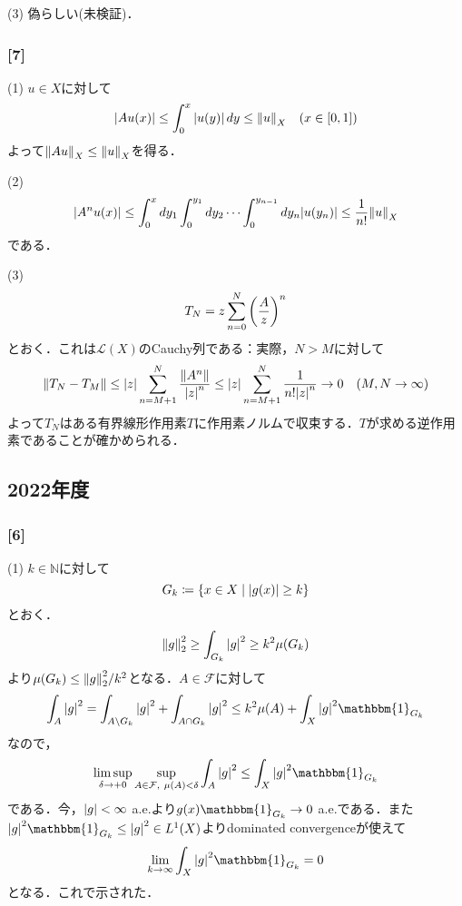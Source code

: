 \documentclass[a4j]{ltjsarticle}
\newcommand{\Nset}{\mathbb{N}}
\newcommand{\1}{\mathbbm{1}}
\numberwithin{equation}{section}
\theoremstyle{definition}
\begin{document}
(3) 偽らしい(未検証)．

\subsubsection*{[7]}
(1) $u\in X$に対して
\begin{equation}
    |Au(x)|\leq \int_{0}^{x}\abs{u(y)}\,dy\leq \norm{u}_{X}\quad (x\in [0,1])
\end{equation}
よって$\norm{Au}_{X}\leq \norm{u}_{X}$を得る．

(2) 
\begin{equation}
    \abs{A^nu(x)}\leq \int_{0}^{x}dy_1\int_{0}^{y_1}dy_2\cdots\int_{0}^{y_{n-1}}dy_{n}\abs{u(y_{n})}\leq \frac{1}{n!}\norm{u}_{X}
\end{equation}
である．

(3) 
\begin{equation}
    T_N=z\sum_{n=0}^N\qty(\frac{A}{z})^n 
\end{equation}
とおく．これは$\mathcal{L}(X)$のCauchy列である：実際，$N>M$に対して
\begin{equation}
    \norm{T_N-T_{M}}\leq \abs{z}\sum_{n=M+1}^N\frac{\norm{A^n}}{\abs{z}^n}\leq \abs{z}\sum_{n=M+1}^{N}\frac{1}{n!\abs{z}^n}\to0\quad (M,N\to\infty)
\end{equation}
よって$T_N$はある有界線形作用素$T$に作用素ノルムで収束する．$T$が求める逆作用素であることが確かめられる．
\subsection{2022年度}
\subsubsection*{[6]}
(1) $k\in\Nset$に対して
\begin{equation}
    G_k\coloneq \qty{x\in X\mid \abs{g(x)}\geq k}
\end{equation}
とおく．
\begin{equation}
    \norm{g}_2^2\geq \int_{G_k}\abs{g}^2\geq k^2\mu(G_k)
\end{equation}
より$\mu(G_k)\leq \norm{g}_2^2/k^2$となる．$A\in \mathcal{F}$に対して
\begin{equation}
    \int_{A}\abs{g}^2=\int_{A\setminus G_k}\abs{g}^2+\int_{A\cap G_k}\abs{g}^2\leq k^2\mu(A)+\int_{X}\abs{g}^2\1_{G_k}
\end{equation}
なので，
\begin{equation}
    \limsup_{\delta\to+0}\sup_{A\in \mathcal{F},\ \mu(A)<\delta}\int_{A}\abs{g}^2\leq \int_{X}\abs{g}^2\1_{G_k}
\end{equation}
である．今，$\abs{g}<\infty$ a.e.より$g(x)\1_{G_k}\to 0$ a.e.である．また$\abs{g}^2\1_{G_k}\leq \abs{g}^2\in L^1(X)$よりdominated convergenceが使えて
\begin{equation}
    \lim_{k\to\infty}\int_{X}\abs{g}^2\1_{G_k}=0 
\end{equation}
となる．これで示された．
\end{document}
